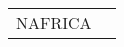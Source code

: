 \documentclass[journal abbreviation, manuscript]{copernicus}
\begin{document}
\begin{table}
\begin{tabularx}{\textwidth}{lX}
  NAFRICA &                                                                                                                                                                                                                                                                                                                                                                                                                                                                                                                                                                                                                                                                                                                                                                                                                                                                                                                                                                                                                                                                                                                                                                                                                                                                                                                                                                                                                                                                                                                                                                                                                                                                                                                                                                                                                                                                                                                                                                                                                                                                                                                                                                                                                                                                                                                                                                                                                                                                                                                                                                                                                                                                                                                                                                                                                                                                                                                                                                                                                                                                                                                                                                                                                                                                                                                                                                                                              
\end{tabularx}
\end{table}
\end{document}
